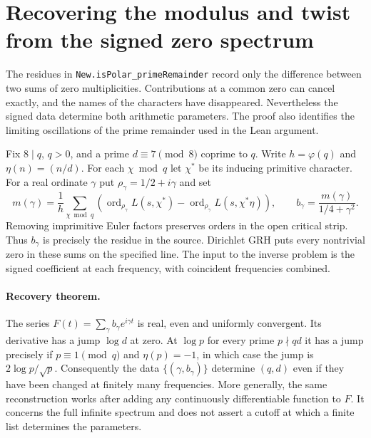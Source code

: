 \section{Recovering the modulus and twist from the signed zero spectrum}
\label{sec:packet}
The residues in \texttt{New.isPolar\_primeRemainder} record only the
difference between two sums of zero multiplicities. Contributions at a common
zero can cancel exactly, and the names of the characters have disappeared.
Nevertheless the signed data determine both arithmetic parameters. The proof
also identifies the limiting oscillations of the prime remainder used in the
Lean argument.

Fix $8\mid q$, $q>0$, and a prime $d\equiv7\pmod 8$ coprime to $q$.
Write $h=\varphi(q)$ and $\eta(n)=(n/d)$. For each $\chi\bmod q$ let
$\chi^*$ be its inducing primitive character. For a real ordinate $\gamma$ put
$\rho_\gamma=1/2+i\gamma$ and set
\[
 m(\gamma)=\frac1h\sum_{\chi\bmod q}
 \left(\operatorname{ord}_{\rho_\gamma} L(s,\chi^*)-
       \operatorname{ord}_{\rho_\gamma} L(s,\chi^*\eta)\right),
 \qquad b_\gamma=\frac{m(\gamma)}{1/4+\gamma^2}.
\]
Removing imprimitive Euler factors preserves orders in the open critical
strip. Thus $b_\gamma$ is precisely the residue in the source. Dirichlet GRH
puts every nontrivial zero in these sums on the specified line.
The input to the inverse problem is the signed coefficient at each frequency,
with coincident frequencies combined.

\paragraph{Recovery theorem.}
The series $F(t)=\sum_\gamma b_\gamma e^{i\gamma t}$ is real, even and
uniformly convergent. Its derivative has a jump $\log d$ at zero. At $\log p$
for every prime $p\nmid qd$ it has a jump precisely if
$p\equiv1\pmod q$ and $\eta(p)=-1$, in which case the jump is
$2\log p/\sqrt p$. Consequently the data $\{(\gamma,b_\gamma)\}$
determine $(q,d)$ even if they have been changed at finitely many frequencies.
More generally, the same reconstruction works after adding any continuously
differentiable function to $F$. It concerns the full infinite spectrum and
does not assert a cutoff at which a finite list determines the parameters.

